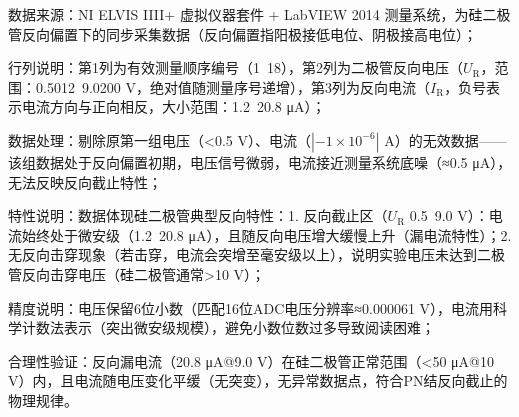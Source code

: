 \documentclass[11pt]{article}
\begin{document}
\begin{table}[htbp]
\begin{threeparttable}
    \begin{tablenotes}
      \item[1] 数据来源：NI ELVIS IIII+ 虚拟仪器套件 + LabVIEW 2014 测量系统，为硅二极管反向偏置下的同步采集数据（反向偏置指阳极接低电位、阴极接高电位）；
      \item[2] 行列说明：第1列为有效测量顺序编号（1~18），第2列为二极管反向电压（$U_{\text{R}}$，范围：0.5012~9.0200 V，绝对值随测量序号递增），第3列为反向电流（$I_{\text{R}}$，负号表示电流方向与正向相反，大小范围：1.2~20.8 μA）；
      \item[3] 数据处理：剔除原第一组电压（<0.5 V）、电流（$|-1 \times 10^{-6}|$ A）的无效数据——该组数据处于反向偏置初期，电压信号微弱，电流接近测量系统底噪（≈0.5 μA），无法反映反向截止特性；
      \item[4] 特性说明：数据体现硅二极管典型反向特性：1. 反向截止区（$U_{\text{R}}$ 0.5~9.0 V）：电流始终处于微安级（1.2~20.8 μA），且随反向电压增大缓慢上升（漏电流特性）；2. 无反向击穿现象（若击穿，电流会突增至毫安级以上），说明实验电压未达到二极管反向击穿电压（硅二极管通常>10 V）；
      \item[5] 精度说明：电压保留6位小数（匹配16位ADC电压分辨率≈0.000061 V），电流用科学计数法表示（突出微安级规模），避免小数位数过多导致阅读困难；
      \item[6] 合理性验证：反向漏电流（20.8 μA@9.0 V）在硅二极管正常范围（<50 μA@10 V）内，且电流随电压变化平缓（无突变），无异常数据点，符合PN结反向截止的物理规律。
    \end{tablenotes}
  \end{threeparttable}
\end{table}
\end{document}
